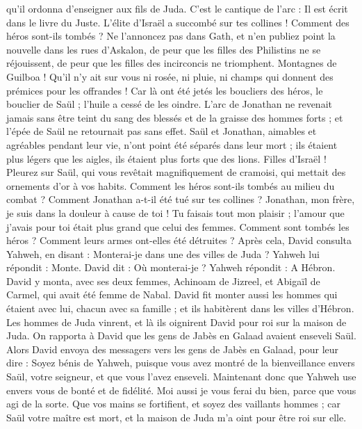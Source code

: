 \begin{multicols}{2}
qu’il ordonna d’enseigner aux fils de Juda. C’est le cantique de l'arc : Il est écrit dans le livre du Juste.
L'élite d'Israël a succombé sur tes collines ! Comment des héros sont-ils tombés ?
Ne l’annoncez pas dans Gath, et n'en publiez point la nouvelle dans les rues d'Askalon, de peur que les filles des Philistins ne se réjouissent, de peur que les filles des incirconcis ne triomphent.
Montagnes de Guilboa ! Qu’il n’y ait sur vous ni rosée, ni pluie, ni champs qui donnent des prémices pour les offrandes ! Car là ont été jetés les boucliers des héros, le bouclier de Saül ; l'huile a cessé de les oindre.
L'arc de Jonathan ne revenait jamais sans être teint du sang des blessés et de la graisse des hommes forts ; et l'épée de Saül ne retournait pas sans effet.
Saül et Jonathan, aimables et agréables pendant leur vie, n'ont point été séparés dans leur mort ; ils étaient plus légers que les aigles, ils étaient plus forts que des lions.
Filles d'Israël ! Pleurez sur Saül, qui vous revêtait magnifiquement de cramoisi, qui mettait des ornements d’or à vos habits.
Comment les héros sont-ils tombés au milieu du combat ? Comment Jonathan a-t-il été tué sur tes collines ?
Jonathan, mon frère, je suis dans la douleur à cause de toi ! Tu faisais tout mon plaisir ; l'amour que j'avais pour toi était plus grand que celui des femmes.
Comment sont tombés les héros ? Comment leurs armes ont-elles été détruites ?
\VerseOne{}Après cela, David consulta Yahweh, en disant : Monterai-je dans une des villes de Juda ? Yahweh lui répondit : Monte. David dit : Où monterai-je ? Yahweh répondit : A Hébron.
David y monta, avec ses deux femmes, Achinoam de Jizreel, et Abigaïl de Carmel, qui avait été femme de Nabal.
David fit monter aussi les hommes qui étaient avec lui, chacun avec sa famille ; et ils habitèrent dans les villes d’Hébron.
Les hommes de Juda vinrent, et là ils oignirent David pour roi sur la maison de Juda. On rapporta à David que les gens de Jabès en Galaad avaient enseveli Saül.
Alors David envoya des messagers vers les gens de Jabès en Galaad, pour leur dire : Soyez bénis de Yahweh, puisque vous avez montré de la bienveillance envers Saül, votre seigneur, et que vous l'avez enseveli.
Maintenant donc que Yahweh use envers vous de bonté et de fidélité. Moi aussi je vous ferai du bien, parce que vous agi de la sorte.
Que vos mains se fortifient, et soyez des vaillants hommes ; car Saül votre maître est mort, et la maison de Juda m'a oint pour être roi sur elle.

\end{multicols}

